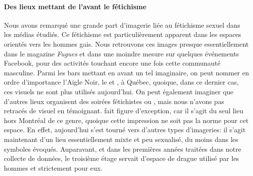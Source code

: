 \paragraph{Des lieux mettant de l'avant le fétichisme}
Nous avons remarqué une grande part d'imagerie liée au fétichisme sexuel dans les médias étudiés.
Ce fétichisme est particulièrement apparent dans les espaces orientés vers les hommes gais.
Nous retrouvons ces images presque essentiellement dans le magazine \emph{Fugues} et dans une moindre mesure sur quelques événements Facebook, pour des activités touchant encore une fois cette communauté masculine.
Parmi les bars mettant en avant un tel imaginaire, on peut nommer en ordre d'importance l'Aigle Noir, le  et , à Québec, quoique, dans ce dernier cas, ces visuels ne sont plus utilisés aujourd'hui.
On peut également imaginer que d'autres lieux organisent des soirées fétichistes ou \bdsm{}, mais nous n'avons pas retracés de visuel en témoignant.
 fait figure d'exception, car il s'agit du seul lieu hors Montréal de ce genre, quoique cette impression ne soit pas la norme pour cet espace.
En effet, aujourd'hui  s'est tourné vers d'autres types d'imageries: il s'agit maintenant d'un lieu essentiellement mixte et peu sexualisé, du moins dans les symboles évoqués.
Auparavant, et dans les premières années traitées dans notre collecte de données, le troisième étage servait d'espace de drague utilisé par les hommes et strictement pour eux.

